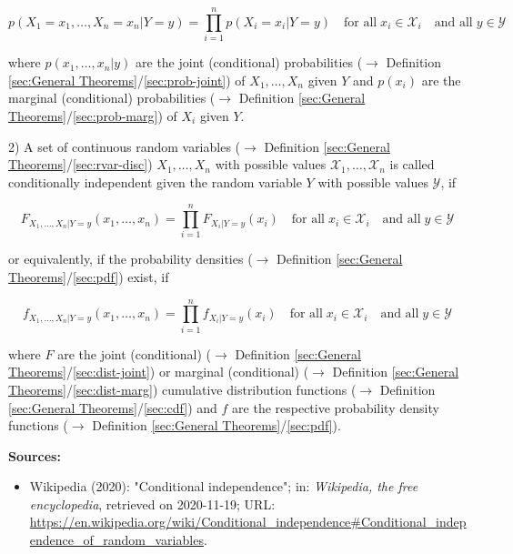 \documentclass[a4paper,12pt,twoside]{book}
\begin{document}
\begin{equation} \label{eq:ind-cond-disc-ind}
p(X_1 = x_1, \ldots, X_n = x_n|Y = y) = \prod_{i=1}^{n} p(X_i = x_i|Y = y) \quad \text{for all} \; x_i \in \mathcal{X}_i \quad \text{and all} \; y \in \mathcal{Y}
\end{equation}

where $p(x_1, \ldots, x_n \vert y)$ are the joint (conditional) probabilities ($\rightarrow$ Definition \ref{sec:General Theorems}/\ref{sec:prob-joint}) of $X_1, \ldots, X_n$ given $Y$ and $p(x_i)$ are the marginal (conditional) probabilities ($\rightarrow$ Definition \ref{sec:General Theorems}/\ref{sec:prob-marg}) of $X_i$ given $Y$.

\vspace{1em}
2) A set of continuous random variables ($\rightarrow$ Definition \ref{sec:General Theorems}/\ref{sec:rvar-disc}) $X_1, \ldots, X_n$ with possible values $\mathcal{X}_1, \ldots, \mathcal{X}_n$ is called conditionally independent given the random variable $Y$ with possible values $\mathcal{Y}$, if

\begin{equation} \label{eq:ind-cond-cond-ind-F}
F_{X_1,\ldots,X_n|Y=y}(x_1,\ldots,x_n) = \prod_{i=1}^{n} F_{X_i|Y=y}(x_i) \quad \text{for all} \; x_i \in \mathcal{X}_i \quad \text{and all} \; y \in \mathcal{Y}
\end{equation}

or equivalently, if the probability densities ($\rightarrow$ Definition \ref{sec:General Theorems}/\ref{sec:pdf}) exist, if

\begin{equation} \label{eq:ind-cond-cont-ind-f}
f_{X_1,\ldots,X_n|Y=y}(x_1,\ldots,x_n) = \prod_{i=1}^{n} f_{X_i|Y=y}(x_i) \quad \text{for all} \; x_i \in \mathcal{X}_i \quad \text{and all} \; y \in \mathcal{Y}
\end{equation}

where $F$ are the joint (conditional) ($\rightarrow$ Definition \ref{sec:General Theorems}/\ref{sec:dist-joint}) or marginal (conditional) ($\rightarrow$ Definition \ref{sec:General Theorems}/\ref{sec:dist-marg}) cumulative distribution functions ($\rightarrow$ Definition \ref{sec:General Theorems}/\ref{sec:cdf}) and $f$ are the respective probability density functions ($\rightarrow$ Definition \ref{sec:General Theorems}/\ref{sec:pdf}).


\vspace{1em}
\textbf{Sources:}
\begin{itemize}
\item Wikipedia (2020): "Conditional independence"; in: \textit{Wikipedia, the free encyclopedia}, retrieved on 2020-11-19; URL: \url{https://en.wikipedia.org/wiki/Conditional_independence#Conditional_independence_of_random_variables}.
\end{itemize}
\end{document}
